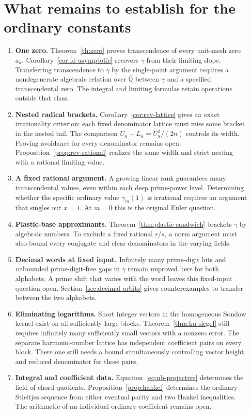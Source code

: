 \documentclass[11pt,a4paper]{article}
\theoremstyle{definition}\newtheorem{definition}[theorem]{Definition}\newtheorem{example}[theorem]{Example}
\theoremstyle{remark}\newtheorem{remark}[theorem]{Remark}
\newcommand{\Q}{\mathbb Q}\newcommand{\Z}{\mathbb Z}\newcommand{\R}{\mathbb R}\newcommand{\N}{\mathbb N}
\begin{document}
\section{What remains to establish for the ordinary constants}\label{sec:questions}
\begin{enumerate}
\item \textbf{One zero.} Theorem~\ref{th:zero} proves transcendence of every unit-mesh zero $a_k$. Corollary~\ref{cor:fd-asymptotic} recovers $\gamma$ from their limiting slope. Transferring transcendence to $\gamma$ by the single-point argument requires a nondegenerate algebraic relation over $\overline{\Q}$ between $\gamma$ and a specified transcendental zero. The integral and limiting formulas retain operations outside that class.
\item \textbf{Nested radical brackets.} Corollary~\ref{cor:rev-lattice} gives an exact irrationality criterion: each fixed denominator lattice must miss some bracket in the nested tail. The comparison $U_n-L_n=U_n^2/(2n)$ controls its width. Proving avoidance for every denominator remains open. Proposition~\ref{prop:rev-rational} realizes the same width and strict nesting with a rational limiting value.
\item \textbf{A fixed rational argument.} A growing linear rank guarantees many transcendental values, even within each deep prime-power level. Determining whether the specific ordinary value $\gamma_m(1)$ is irrational requires an argument that singles out $x=1$. At $m=0$ this is the original Euler question.
\item \textbf{Plastic-base approximants.} Theorem~\ref{thm:plastic-sandwich} brackets $\gamma$ by algebraic numbers. To exclude a fixed rational $r/s$, a norm argument must also bound every conjugate and clear denominators in the varying fields.
\item \textbf{Decimal words at fixed input.} Infinitely many prime-digit hits and unbounded prime-digit-free gaps in $\gamma$ remain unproved here for both alphabets. A prime shift that varies with the word leaves this fixed-input question open. Section~\ref{sec:decimal-orbits} gives counterexamples to transfer between the two alphabets.
\item \textbf{Eliminating logarithms.} Short integer vectors in the homogeneous Sondow kernel exist on all sufficiently large blocks. Theorem~\ref{thm:ku-siegel} still requires infinitely many sufficiently small vectors with a nonzero error. The separate harmonic-number lattice has independent coefficient pairs on every block. There one still needs a bound simultaneously controlling vector height and reduced denominator for those pairs.
\item \textbf{Integral and coefficient data.} Equation~\eqref{eq:ub-projective} determines the field of chord quotients. Proposition~\ref{prop:hankel} determines the ordinary Stieltjes sequence from either eventual parity and two Hankel inequalities. The arithmetic of an individual ordinary coefficient remains open.
\end{enumerate}
\end{document}

